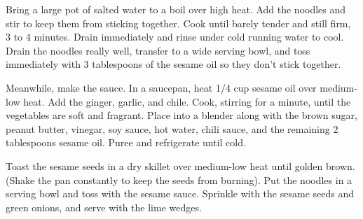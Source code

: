 Bring a large pot of salted water to a boil over high heat. Add the noodles and stir to keep them from sticking together. Cook until barely tender and still firm, 3 to 4 minutes. Drain immediately and rinse under cold running water to cool. Drain the noodles really well, transfer to a wide serving bowl, and toss immediately with 3 tablespoons of the sesame oil so they don't stick together.

Meanwhile, make the sauce. In a saucepan, heat 1/4 cup sesame oil over medium-low heat. Add the ginger, garlic, and chile. Cook, stirring for a minute, until the vegetables are soft and fragrant. Place into a blender along with the brown sugar, peanut butter, vinegar, soy sauce, hot water, chili sauce, and the remaining 2 tablespoons sesame oil. Puree and refrigerate until cold.

Toast the sesame seeds in a dry skillet over medium-low heat until golden brown. (Shake the pan constantly to keep the seeds from burning). Put the noodles in a serving bowl and toss with the sesame sauce. Sprinkle with the sesame seeds and green onions, and serve with the lime wedges.

